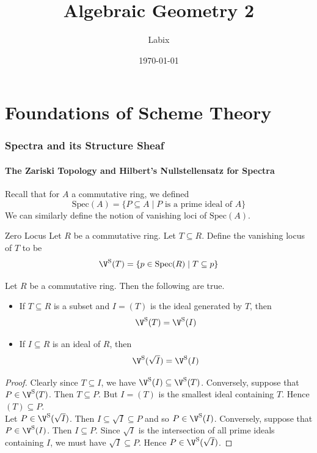 \documentclass[a4paper]{article}
\title{Algebraic Geometry 2}
\author{Labix}
\date{\today}
\begin{document}
\maketitle

\pagebreak
\tableofcontents
\pagebreak

\part{Foundations of Scheme Theory}

\pagebreak
\section{Spectra and its Structure Sheaf}
\subsection{The Zariski Topology and Hilbert's Nullstellensatz for Spectra}
Recall that for $A$ a commutative ring, we defined $$\text{Spec}(A)=\{P\subseteq A\;|\;P\text{ is a prime ideal of }A\}$$ We can similarly define the notion of vanishing loci of $\text{Spec}(A)$. 

\begin{defn}{Zero Locus}{} Let $R$ be a commutative ring. Let $T\subseteq R$. Define the vanishing locus of $T$ to be $$\V^\text{S}(T)=\{p\in\text{Spec}(R)\;|\;T\subseteq p\}$$
\end{defn}

\begin{lmm}{}{} Let $R$ be a commutative ring. Then the following are true. 
\begin{itemize}
\item If $T\subseteq R$ is a subset and $I=(T)$ is the ideal generated by $T$, then $$\V^\text{S}(T)=\V^\text{S}(I)$$
\item If $I\subseteq R$ is an ideal of $R$, then $$\V^\text{S}(\sqrt{I})=\V^\text{S}(I)$$
\end{itemize}
\begin{proof}
Clearly since $T\subseteq I$, we have $\V^\text{S}(I)\subseteq\V^\text{S}(T)$. Conversely, suppose that $P\in\V^\text{S}(T)$. Then $T\subseteq P$. But $I=(T)$ is the smallest ideal containing $T$. Hence $(T)\subseteq P$. \\

Let $P\in\V^\text{S}(\sqrt{I})$. Then $I\subseteq\sqrt{I}\subseteq P$ and so $P\in\V^\text{S}(I)$. Conversely, suppose that $P\in\V^\text{S}(I)$. Then $I\subseteq P$. Since $\sqrt{I}$ is the intersection of all prime ideals containing $I$, we must have $\sqrt{I}\subseteq P$. Hence $P\in\V^\text{S}(\sqrt{I})$. 
\end{proof}
\end{lmm}
\end{document}
